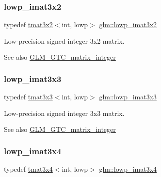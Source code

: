 \subsubsection{\texorpdfstring{lowp\+\_\+imat3x2}{lowp\_imat3x2}}
{\footnotesize\ttfamily typedef \hyperlink{structglm_1_1tmat3x2}{tmat3x2}$<$int, lowp$>$ \hyperlink{group__gtc__matrix__integer_ga93514d2df726334e6d5edd373635d343}{glm\+::lowp\+\_\+imat3x2}}

Low-\/precision signed integer 3x2 matrix. \begin{DoxySeeAlso}{See also}
\hyperlink{group__gtc__matrix__integer}{G\+L\+M\+\_\+\+G\+T\+C\+\_\+matrix\+\_\+integer} 
\end{DoxySeeAlso}
\mbox{\label{group__gtc__matrix__integer_ga434abdeee9a8908660691be659f6693f}} 
\subsubsection{\texorpdfstring{lowp\+\_\+imat3x3}{lowp\_imat3x3}}
{\footnotesize\ttfamily typedef \hyperlink{structglm_1_1tmat3x3}{tmat3x3}$<$int, lowp$>$ \hyperlink{group__gtc__matrix__integer_ga434abdeee9a8908660691be659f6693f}{glm\+::lowp\+\_\+imat3x3}}

Low-\/precision signed integer 3x3 matrix. \begin{DoxySeeAlso}{See also}
\hyperlink{group__gtc__matrix__integer}{G\+L\+M\+\_\+\+G\+T\+C\+\_\+matrix\+\_\+integer} 
\end{DoxySeeAlso}
\mbox{\label{group__gtc__matrix__integer_ga61fe3487c1f4f10fb0f5c9fa0873a694}} 
\subsubsection{\texorpdfstring{lowp\+\_\+imat3x4}{lowp\_imat3x4}}
{\footnotesize\ttfamily typedef \hyperlink{structglm_1_1tmat3x4}{tmat3x4}$<$int, lowp$>$ \hyperlink{group__gtc__matrix__integer_ga61fe3487c1f4f10fb0f5c9fa0873a694}{glm\+::lowp\+\_\+imat3x4}}

